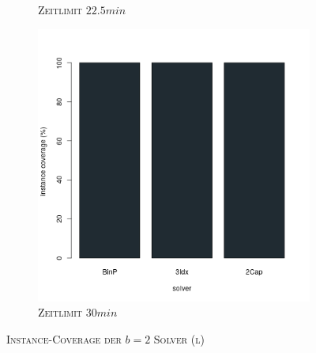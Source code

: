 \begin{figure}[H]
\begin{subfigure}[b]{0.3\textwidth}
\caption{\textsc{Zeitlimit} $22.5min$}
\label{fig:instance_cov_b=2_l_b}
\end{subfigure}
\hfill
\begin{subfigure}[b]{0.3\textwidth}
\centering
\includegraphics[width=1.2\textwidth]{img/solver_instance_coverage_b=2_l_1800s.png}
\caption{\textsc{Zeitlimit} $30min$}
\label{fig:instance_cov_b=2_l_c}
\end{subfigure}

\caption{\textsc{Instance-Coverage der $b=2$ Solver (l)}}
\label{fig:instance_cov_b=2_l}
\end{figure}

